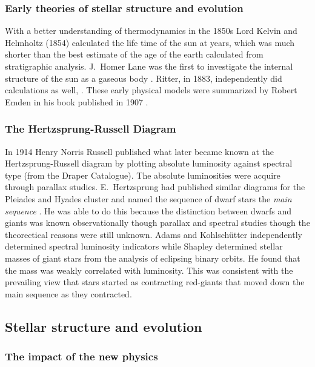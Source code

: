 \subsubsection{Early theories of stellar structure and evolution}

With a better understanding of thermodynamics in the
1850s Lord Kelvin and Helmholtz (1854) calculated the life time of the
sun at  years, which was much shorter than the best
estimate of the age of the earth calculated from stratigraphic
analysis. J.~Homer Lane was the first to investigate the internal
structure of the sun as a gaseous body \cite{Lane1870}. Ritter, in
1883, independently did calculations as well, \cite{Ritter1883,
Ritter1883a, Ritter1898}. These early physical
models were summarized by Robert Emden in his book 
published in 1907 \cite{Emden1907}.

\subsubsection{The Hertzsprung-Russell Diagram}

In 1914  Henry Norris Russell \cite{Russell1914a,
Russell1914b} published what later became known at the
Hertzsprung-Russell diagram by plotting absolute luminosity against
spectral type (from the Draper Catalogue). The absolute luminosities
were acquire through parallax studies. E.~Hertzsprung
 had published similar diagrams for the Pleiades
and Hyades cluster and named the sequence of dwarf stars
the \textit{main sequence} \cite{Hertzsprung1911}.  He was able to do
this because the distinction between dwarfs and giants was known
observationally though parallax and spectral studies though the
theorectical reasons were still unknown. Adams and 
Kohlschütter \cite{Adams1914} independently determined spectral
luminosity indicators while Shapley determined stellar masses of giant
stars from the analysis of eclipsing binary orbits. He found that the
mass was weakly correlated with luminosity.  This was consistent with
the prevailing view that stars started as contracting red-giants that
moved down the main sequence as they contracted.


\subsection{Stellar structure and evolution}

\subsubsection{The impact of the new physics}

